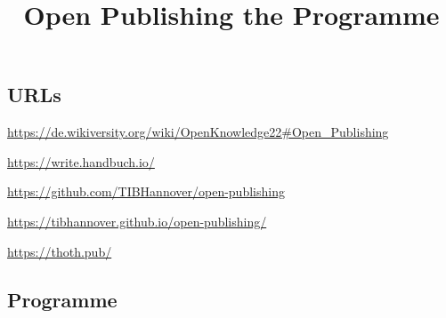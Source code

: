 \documentclass{article}
\begin{document}
\title{Open Publishing the Programme}

\maketitle


\subsection{URLs}\label{H3586326}



\href{https://de.wikiversity.org/wiki/OpenKnowledge22#Open_Publishing}{https://de.wikiversity.org/wiki/OpenKnowledge22\#Open\_Publishing}


\href{https://write.handbuch.io/}{https://write.handbuch.io/}


\href{https://github.com/TIBHannover/open-publishing}{https://github.com/TIBHannover/open-publishing}


\href{https://tibhannover.github.io/open-publishing/}{https://tibhannover.github.io/open-publishing/}


\href{https://thoth.pub/}{https://thoth.pub/}


\subsection{Programme}\label{H5429092}
\end{document}
